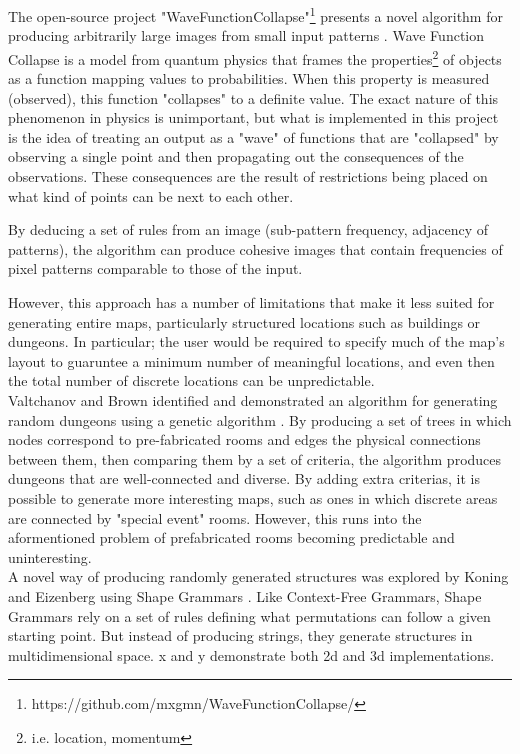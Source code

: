 \documentclass{article}
\begin{document}
The open-source project "WaveFunctionCollapse"\footnote{https://github.com/mxgmn/WaveFunctionCollapse/} presents a novel algorithm for producing arbitrarily large images from small input patterns \cite{wfc-report}. Wave Function Collapse is a model from quantum physics that frames the properties\footnote{i.e. location, momentum} of objects as a function mapping values to probabilities. When this property is measured (observed), this function "collapses" to a definite value. The exact nature of this phenomenon in physics is unimportant, but what is implemented in this project is the idea of treating an output as a "wave" of functions that are "collapsed" by observing a single point and then propagating out the consequences of the observations. These consequences are the result of restrictions being placed on what kind of points can be next to each other.



By deducing a set of rules from an image (sub-pattern frequency, adjacency of patterns), the algorithm can produce cohesive images that contain frequencies of pixel patterns comparable to those of the input. 



However, this approach has a number of limitations that make it less suited for generating entire maps, particularly structured locations such as buildings or dungeons. In particular; the user would be required to specify much of the map's layout to guaruntee a minimum number of meaningful locations, and even then the total number of discrete locations can be unpredictable.\\



Valtchanov and Brown identified and demonstrated an algorithm for generating random dungeons using a genetic algorithm \cite{genetic}. By producing a set of trees in which nodes correspond to pre-fabricated rooms and edges the physical connections between them, then comparing them by a set of criteria, the algorithm produces dungeons that are well-connected and diverse. By adding extra criterias, it is possible to generate more interesting maps, such as ones in which discrete areas are connected by "special event" rooms. However, this runs into the aformentioned problem of prefabricated rooms becoming predictable and uninteresting.\\



A novel way of producing randomly generated structures was explored by Koning and Eizenberg using Shape Grammars \cite{koning1981language}. Like Context-Free Grammars, Shape Grammars rely on a set of rules defining what permutations can follow a given starting point. But instead of producing strings, they generate structures in multidimensional space. x and y demonstrate both 2d and 3d implementations. 
\end{document}
